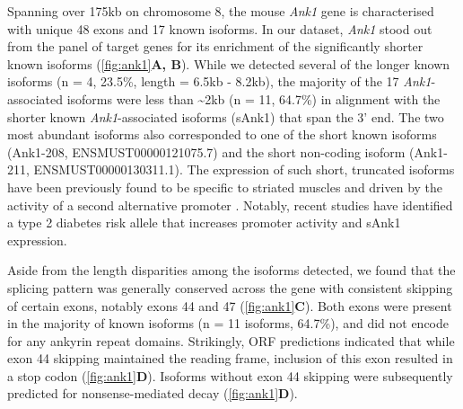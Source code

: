 Spanning over 175kb on chromosome 8, the mouse \textit{Ank1} gene is characterised with unique 48 exons and 17 known isoforms. In our dataset, \textit{Ank1} stood out from the panel of target genes for its enrichment of the significantly shorter known isoforms (\cref{fig:ank1}\textbf{A, B}). While we detected several of the longer known isoforms (n = 4, 23.5\%, length = 6.5kb - 8.2kb), the majority of the 17 \textit{Ank1}-associated isoforms were less than \textasciitilde 2kb (n = 11, 64.7\%) in alignment with the shorter known \textit{Ank1}-associated isoforms (sAnk1) that span the 3' end. The two most abundant isoforms also corresponded to one of the short known isoforms (Ank1-208, ENSMUST00000121075.7) and the short non-coding isoform (Ank1-211, ENSMUST00000130311.1). The expression of such short, truncated isoforms have been previously found to be specific to striated muscles and driven by the activity of a second alternative promoter \cite{Gallagher1998}. Notably, recent studies have identified a type 2 diabetes risk allele that increases promoter activity and sAnk1 expression\cite{Yan2016}.  %

Aside from the length disparities among the isoforms detected, we found that the splicing pattern was generally conserved across the gene with consistent skipping of certain exons, notably exons 44 and 47 (\cref{fig:ank1}\textbf{C}). Both exons were present in the majority of known isoforms (n = 11 isoforms, 64.7\%), and did not encode for any ankyrin repeat domains. Strikingly, ORF predictions indicated that while exon 44 skipping maintained the reading frame, inclusion of this exon resulted in a stop codon (\cref{fig:ank1}\textbf{D}). Isoforms without exon 44 skipping were subsequently predicted for nonsense-mediated decay (\cref{fig:ank1}\textbf{D}). 


